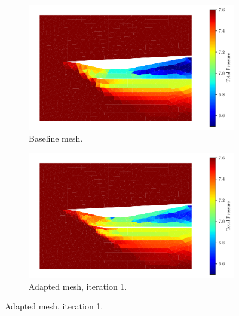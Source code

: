 \pagebreak
\begin{figure}[h!]\ContinuedFloat
    \centering
    \begin{subfigure}[h]{0.49\linewidth}
        \centering
        \includegraphics[width=\linewidth]{rep/q4/Pfield0.pdf}
        \caption{Baseline mesh.}
    \end{subfigure}
    \begin{subfigure}[h]{0.49\linewidth}
        \centering
        \includegraphics[width=\linewidth]{rep/q4/Pfield1.pdf}
        \caption{Adapted mesh, iteration 1.}
    \end{subfigure}


\end{figure}
